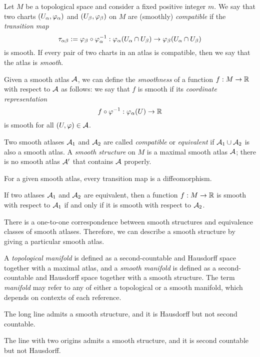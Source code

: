 \documentclass{../note}
\begin{document}
\begin{prb}
Let $M$ be a topological space and consider a fixed positive integer $m$.
We say that two charts $(U_\alpha,\varphi_\alpha)$ and $(U_\beta,\varphi_\beta)$ on $M$ are (smoothly) \emph{compatible} if the \emph{transition map}
\[\tau_{\alpha\beta}:=\varphi_\beta\circ\varphi_\alpha^{-1}:\varphi_\alpha(U_\alpha\cap U_\beta)\to\varphi_\beta(U_\alpha\cap U_\beta)\]
is smooth.
If every pair of two charts in an atlas is compatible, then we say that the atlas is \emph{smooth}.

Given a smooth atlas $\mathcal{A}$, we can define the \emph{smoothness} of a function $f:M\to\mathbb{R}$ with respect to $\mathcal{A}$ as follows: we say that $f$ is smooth if its \emph{coordinate representation}
\[f\circ\varphi^{-1}:\varphi_\alpha(U)\to\mathbb{R}\]
is smooth for all $(U,\varphi)\in\mathcal{A}$.

Two smooth atlases $\mathcal{A}_1$ and $\mathcal{A}_2$ are called \emph{compatible} or \emph{equivalent} if $\mathcal{A}_1\cup\mathcal{A}_2$ is also a smooth atlas.
A \emph{smooth structure} on $M$ is a maximal smooth atlas $\mathcal{A}$; there is no smooth atlas $\mathcal{A}'$ that contains $\mathcal{A}$ properly.
\begin{parts}
\item For a given smooth atlas, every transition map is a diffeomorphism.
\item If two atlases $\mathcal{A}_1$ and $\mathcal{A}_2$ are equivalent, then a function $f:M\to\mathbb{R}$ is smooth with respect to $\mathcal{A}_1$ if and only if it is smooth with respect to $\mathcal{A}_2$.
\item There is a one-to-one correspondence between smooth structures and equivalence classes of smooth atlases. Therefore, we can describe a smooth structure by giving a particular smooth atlas.
\end{parts}
\end{prb}

\begin{prb}[Manifolds]
A \emph{topological manifold} is defined as a second-countable and Hausdorff space together with a maximal atlas, and a \emph{smooth manifold} is defined as a second-countable and Hausdorff space together with a smooth structure.
The term \emph{manifold} may refer to any of either a topological or a smooth manifold, which depends on contexts of each reference.
\begin{parts}
\item The long line admits a smooth structure, and it is Hausdorff but not second countable.
\item The line with two origins admits a smooth structure, and it is second countable but not Hausdorff.
\end{parts}
\end{prb}
\end{document}
